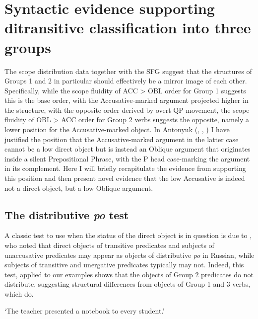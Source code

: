 \documentclass[output=paper,colorlinks,citecolor=brown,modfonts,nonflat]{langsci/langscibook}
\begin{document}
\section{Syntactic evidence supporting ditransitive classification into three groups}\label{sec:antonyuk:3}

The scope distribution data together with the SFG suggest that the structures of Groups 1 and 2 in particular should effectively be a mirror image of each other. Specifically, while the scope fluidity of ACC > OBL order for Group 1 suggests this is the base order, with the Accusative-marked argument projected higher in the structure, with the opposite order derived by overt QP movement, the scope fluidity of OBL > ACC order for Group 2 verbs suggests the opposite, namely a lower position for the Accusative-marked object. In Antonyuk (\citeyear{Antonyuk2015}, \citeyear{Antonyuk2017}, \citeyear{Antonyuk2018}) I have justified the position that the Accusative-marked argument in the latter case cannot be a low direct object but is instead an Oblique argument that originates inside a silent Prepositional Phrase, with the P head case-marking the argument in its complement. Here I will briefly recapitulate the evidence from \citet{Antonyuk2015} supporting this position and then present novel evidence that the low Accusative is indeed not a direct object, but a low Oblique argument.

\subsection{The distributive \textit{po} test}\label{sec:antonyuk:3.1}

A classic test to use when the status of the direct object is in question is due to \citet{Pesetsky1982}, who noted that direct objects of transitive predicates and subjects of unaccusative predicates may appear as objects of distributive \textit{po} in Russian, while subjects of transitive and unergative predicates typically may not. Indeed, this test, applied to our examples shows that the objects of Group 2 predicates do not distribute, suggesting structural differences from objects of Group 1 and 3 verbs, which do.


    \glt    `The teacher presented a notebook to every student.'
    \z
\end{document}
